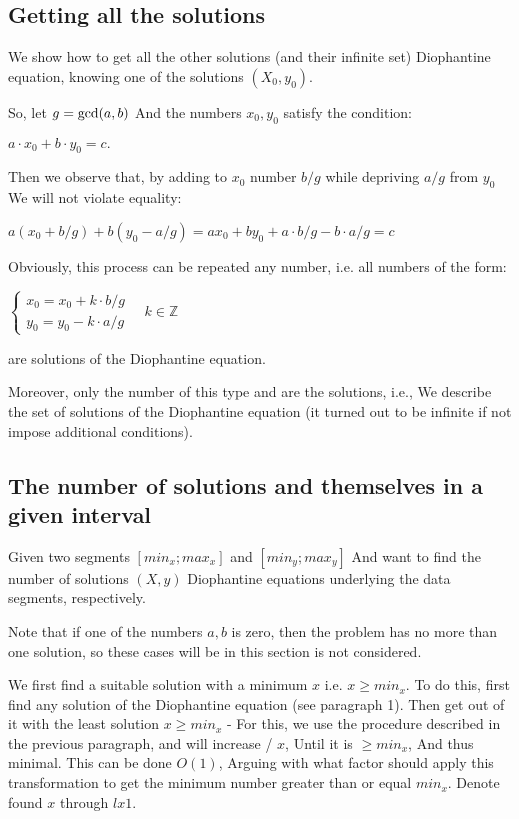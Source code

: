 \subsection{ Getting all the solutions }

We show how to get all the other solutions (and their infinite set) Diophantine equation, knowing one of the solutions $(X_0, y_0)$.

So, let $g = {\rm gcd} (a, b)$ And the numbers $x_0, y_0$ satisfy the condition:

$a \cdot x_0 + b \cdot y_0 = c.$

Then we observe that, by adding to $x_0$ number $b / g$ while depriving $a / g$ from $y_0$ We will not violate equality:

$a(x_{0}+b/g)+b(y_{0}-a/g)=ax_{0}+by_{0}+a\cdot b/g-b\cdot a/g=c$

Obviously, this process can be repeated any number, i.e. all numbers of the form:

$
 \begin{cases}
x_{0}=x_{0}+k\cdot b/g\\
y_{0}=y_{0}-k\cdot a/g
\end{cases}\quad k\in\mathbb{Z}
$

are solutions of the Diophantine equation.

Moreover, only the number of this type and are the solutions, i.e., We describe the set of solutions of the Diophantine equation (it turned out to be infinite if not impose additional conditions).

\subsection{ The number of solutions and themselves in a given interval }

Given two segments $[min_x; max_x]$ and $[min_y; max_y]$ And want to find the number of solutions $(X, y)$ Diophantine equations underlying the data segments, respectively.

Note that if one of the numbers $a, b$ is zero, then the problem has no more than one solution, so these cases will be in this section is not considered.

We first find a suitable solution with a minimum $x$ i.e. $x \ge min_x$. To do this, first find any solution of the Diophantine equation (see paragraph 1). Then get out of it with the least solution $x \ge min_x$ - For this, we use the procedure described in the previous paragraph, and will increase / $x$, Until it is $\ge min_x$, And thus minimal. This can be done $O (1)$, Arguing with what factor should apply this transformation to get the minimum number greater than or equal $min_x$. Denote found $x$ through $lx1$.

